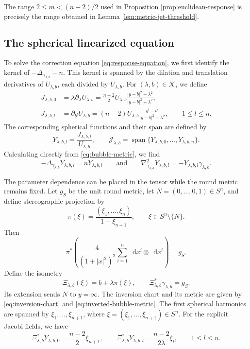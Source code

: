 \documentclass[11pt]{article}
\numberwithin{equation}{section}
\theoremstyle{remark}
\newcommand{\Sph}{S}
\newcommand{\dd}{\mathop{}\!\mathrm{d}}
\begin{document}
{The range \(2\le m<(n-2)/2\) used in
Proposition  \ref{prop:euclidean-response} is precisely the range obtained
in Lemma  \ref{lem:metric-jet-threshold}.}

\subsection{The spherical linearized equation}

To solve the correction equation \eqref{eq:response-equation}, we first identify the kernel of \(-\Delta_{\gamma_{\lambda,b}}-n\). This kernel is spanned by the dilation and translation derivatives of \(U_{\lambda,b}\), each divided by \(U_{\lambda,b}\).  For
\((\lambda,b)\in\mathcal K\), we define
\[
 \begin{aligned}
 J_{\lambda,b,0}
 &=\lambda\partial_\lambda U_{\lambda,b}
 =\frac{n-2}{2}U_{\lambda,b}
   \frac{|y-b|^2-\lambda^2}{|y-b|^2+\lambda^2},\\
 J_{\lambda,b,l}
 &=\partial_{b^l}U_{\lambda,b}
 =(n-2)U_{\lambda,b}
   \frac{y^l-b^l}{|y-b|^2+\lambda^2},
 \qquad 1\le l\le n.
 \end{aligned}
\]
The corresponding spherical functions and their span are defined by
\[
 Y_{\lambda,b,l}=\frac{J_{\lambda,b,l}}{U_{\lambda,b}},
 \qquad
 \mathcal J_{\lambda,b}
 =\operatorname{span}\{
 Y_{\lambda,b,0},\ldots,Y_{\lambda,b,n}\}.
\]
{Calculating directly from \eqref{eq:bubble-metric}, we find}
\begin{equation}\label{eq:jacobi-hessian}
 -\Delta_{\gamma_{\lambda,b}}Y_{\lambda,b,l}
 =nY_{\lambda,b,l}\qquad \text{and} \qquad
 \nabla_{\gamma_{\lambda,b}}^2Y_{\lambda,b,l}
 =-Y_{\lambda,b,l}\gamma_{\lambda,b}.
\end{equation}

The parameter dependence can be placed in the tensor while the round
metric remains fixed. Let \(g_{S}\) be the unit round metric,
let \(N=(0,\ldots,0,1)\in\Sph^n\), and define stereographic projection by
\[
 \pi(\xi)=\frac{(\xi_1,\ldots,\xi_n)}{1-\xi_{n+1}},
 \qquad \xi\in\Sph^n\setminus\{N\}.
\]
Then
\[
 \pi^*\!\left(\frac4{(1+|x|^2)^2}\sum_{i=1}^n\dd x^i\otimes\dd x^i\right)
 =g_{S}.
\]
Define the isometry
\begin{equation}\label{eq:fixed-round-identification}
 \Xi_{\lambda,b}(\xi)=b+\lambda\pi(\xi),\qquad
 \Xi_{\lambda,b}^*\gamma_{\lambda,b}=g_{S}.
\end{equation}
Its extension sends \(N\) to \(y=\infty\).
The inversion chart and its metric are given by
\eqref{eq:inversion-chart}  and \eqref{eq:inverted-bubble-metric}.
{The first spherical harmonics are spanned by
\(\xi_1,\ldots,\xi_{n+1}\), where
\(\xi=(\xi_1,\ldots,\xi_{n+1})\in\Sph^n\).}
{For the explicit Jacobi fields, we have}
\begin{equation}\label{eq:fixed-round-jacobi}
 \Xi_{\lambda,b}^*Y_{\lambda,b,0}
 =\frac{n-2}{2}\xi_{n+1},\qquad
 \Xi_{\lambda,b}^*Y_{\lambda,b,l}
 =\frac{n-2}{2\lambda}\xi_l,\qquad 1\le l\le n.
\end{equation}
\end{document}
